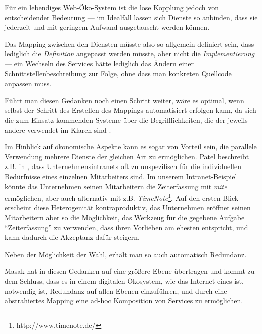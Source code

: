 \label{l:intro-loosecoupling}Für ein lebendiges Web-Öko-System ist die lose Kopplung jedoch von entscheidender Bedeutung --- im Idealfall lassen sich Dienste so anbinden, dass sie jederzeit und mit geringem Aufwand ausgetauscht werden können. 

Das Mapping zwischen den Diensten müsste also so allgemein definiert sein, dass lediglich die \emph{Definition} angepasst werden müsste, aber nicht die \emph{Implementierung} --- ein Wechseln des Services hätte lediglich das Ändern einer Schnittstellenbeschreibung zur Folge, ohne dass man konkreten Quellcode anpassen muss.

Führt man diesen Gedanken noch einen Schritt weiter, wäre es optimal, wenn selbst der Schritt des Erstellen des Mappings automatisiert erfolgen kann, da sich die zum Einsatz kommenden Systeme über die Begrifflichkeiten, die der jeweils andere verwendet im Klaren sind \cite{mkdigioe}.

Im Hinblick auf ökonomische Aspekte kann es sogar von Vorteil sein, die parallele Verwendung mehrere Dienste der gleichen Art zu ermöglichen. Patel beschreibt z.B. in \cite{pl-depintra}, dass Unternehmensintranets oft zu unspezifisch für die individuellen Bedürfnisse eines einzelnen Mitarbeiters sind. Im unserem Intranet-Beispiel könnte das Unternehmen seinen Mitarbeitern die Zeiterfassung mit \emph{mite} ermöglichen, aber auch alternativ mit z.B. \emph{TimeNote}\footnote{http://www.timenote.de/}. Auf den ersten Blick erscheint diese Heterogenität kontraproduktiv, das Unternehmen eröffnet seinen Mitarbeitern aber so die Möglichkeit, das Werkzeug für die gegebene Aufgabe "`Zeiterfassung"' zu verwenden, dass ihren  Vorlieben am ehesten entspricht, und kann dadurch die Akzeptanz dafür steigern.

Neben der Möglichkeit der Wahl, erhält man so auch automatisch Redundanz.

Masak hat in \cite{mkulss} diesen Gedanken auf eine größere Ebene übertragen und kommt zu dem Schluss, dass es in einem digitalen Ökosystem, wie das Internet eines ist, notwendig ist, Redundanz auf allen Ebenen einzuführen, und durch eine abstrahiertes Mapping eine ad-hoc Komposition von Services zu ermöglichen.
